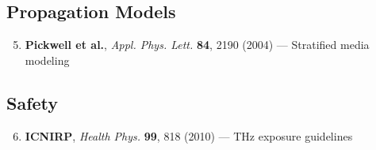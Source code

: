 \subsection*{Propagation Models}

\begin{enumerate}
\setcounter{enumi}{4}
\item \textbf{Pickwell et al.}, \emph{Appl. Phys. Lett.} \textbf{84}, 2190 (2004) --- Stratified media modeling
\end{enumerate}

\subsection*{Safety}

\begin{enumerate}
\setcounter{enumi}{5}
\item \textbf{ICNIRP}, \emph{Health Phys.} \textbf{99}, 818 (2010) --- THz exposure guidelines
\end{enumerate}
